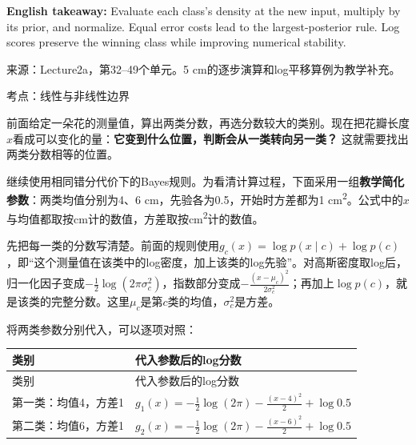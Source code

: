 \textbf{English takeaway:} Evaluate each class's density at the new input, multiply by its prior, and normalize. Equal error costs lead to the largest-posterior rule. Log scores preserve the winning class while improving numerical stability.


来源：Lecture2a，第32–49个单元。5 cm的逐步演算和log平移算例为教学补充。








考点：线性与非线性边界
 

前面给定一朵花的测量值，算出两类分数，再选分数较大的类别。现在把花瓣长度\(x\)看成可以变化的量：\textbf{它变到什么位置，判断会从一类转向另一类？} 这就需要找出两类分数相等的位置。


继续使用相同错分代价下的Bayes规则。为看清计算过程，下面采用一组\textbf{教学简化参数}：两类均值分别为4、6 cm，先验各为0.5，开始时方差都为1 cm\textsuperscript{2}。公式中的\(x\)与均值都取按cm计的数值，方差取按cm\textsuperscript{2}计的数值。


先把每一类的分数写清楚。前面的规则使用\(g_c(x)=\log p(x\mid c)+\log p(c)\)，即“这个测量值在该类中的log密度，加上该类的log先验”。对高斯密度取log后，归一化因子变成\(-\tfrac12\log(2\pi\sigma_c^2)\)，指数部分变成\(-\tfrac{(x-\mu_c)^2}{2\sigma_c^2}\)；再加上\(\log p(c)\)，就是该类的完整分数。这里\(\mu_c\)是第\(c\)类的均值，\(\sigma_c^2\)是方差。


将两类参数分别代入，可以逐项对照：


\begingroup
\small\setlength{\tabcolsep}{3pt}
\renewcommand{\arraystretch}{1.22}
\begin{longtable}{@{}>{\raggedright\arraybackslash}p{}>{\raggedright\arraybackslash}p{}@{}}
\toprule
类别 & 代入参数后的log分数 \\
\midrule\endfirsthead
类别 & 代入参数后的log分数 \\
\midrule\endhead
\bottomrule\endfoot
第一类：均值4，方差1 & \(g_1(x)=-\tfrac12\log(2\pi)-\tfrac{(x-4)^2}{2}+\log0.5\) \\
第二类：均值6，方差1 & \(g_2(x)=-\tfrac12\log(2\pi)-\tfrac{(x-6)^2}{2}+\log0.5\) \\
\end{longtable}
\endgroup


